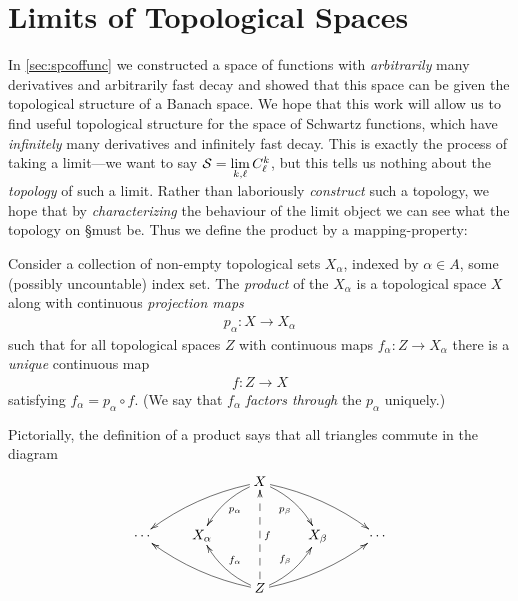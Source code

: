     \section{Limits of Topological Spaces}
      
      \noindent
      In \autoref{sec:spcoffunc} we constructed a space of functions with \emph{arbitrarily} many derivatives and arbitrarily fast decay and showed that this space can be given the topological structure of a Banach space.
      We hope that this work will allow us to find useful topological structure for the space of Schwartz functions, which have \emph{infinitely} many derivatives and infinitely fast decay.
      This is exactly the process of taking a limit---we want to say $\S=\lim\limits_{k,\ell}C^k_\ell$, but this tells us nothing about the \emph{topology} of such a limit.
      Rather than laboriously \emph{construct} such a topology, we hope that by \emph{characterizing} the behaviour of the limit object we can see what the topology on \S must be.
      Thus we define the product by a mapping-property:
%
      \begin{defn}
        Consider a collection of non-empty topological sets $X_\alpha$, indexed by $\alpha\in A$, some (possibly uncountable) index set.
        The \emph{product} of the $X_\alpha$ is a topological space $X$ along with continuous \emph{projection maps} 
        \begin{align*}
          p_\alpha:X\longrightarrow X_\alpha
        \end{align*}
        such that for all topological spaces $Z$ with continuous maps $f_\alpha:Z\rightarrow X_\alpha$ there is a \emph{unique} continuous map 
        \begin{align*}
          f:Z\longrightarrow X
        \end{align*}
        satisfying $f_\alpha=p_\alpha\circ f$.
        (We say that $f_\alpha$ \emph{factors through} the $p_\alpha$ uniquely.)
      \end{defn}
      Pictorially, the definition of a product says that all triangles commute in the diagram
      \begin{displaymath}
        \xymatrix{
          && X \ar@/_/[dll] \ar@/_/[dl]^{p_\alpha} \ar@/^/[dr]_{p_\beta} \ar@/^/[drr] \\
          \cdots & X_\alpha && X_\beta & \cdots\\
          && Z \ar@/^/[ull] \ar@/^/[ul]_{f_\alpha} \ar@{-->}[uu]_f \ar@/_/[ur]^{f_\beta} \ar@/_/[urr]
         }
      \end{displaymath}

